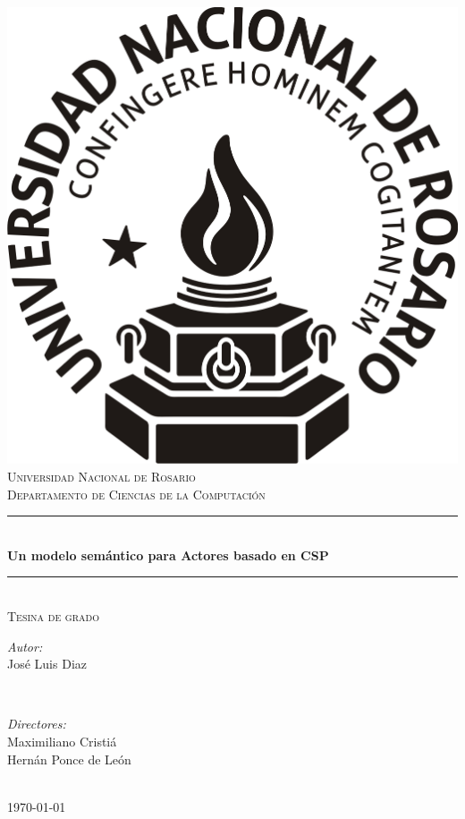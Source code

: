 \begin{titlepage}
\centering
\vspace*{0.5 cm}
        \includegraphics[width=3.0 cm]{img/logo.png}\\[1.0 cm]
        \textsc{\LARGE Universidad Nacional de Rosario}\\[0.5 cm]
	\textsc{\large Departamento de Ciencias de la Computaci\'{o}n}\\[2.5 cm]

	\rule{\linewidth}{0.3 mm} \\[0.4 cm]
	{ \huge \bfseries Un modelo semántico para Actores basado en CSP }\\
	\rule{\linewidth}{0.3 mm} \\[0.5 cm]
	\textsc{\Large Tesina de grado}\\[2.5 cm]
	
	\begin{minipage}{0.4\textwidth}
	\begin{flushleft} \large
	  \emph{Autor:}\\
	  José Luis Diaz  \\
	\end{flushleft}
	\end{minipage}~
	\begin{minipage}{0.4\textwidth}
        \begin{flushright} \large
	  \emph{Directores:} \\
	  Maximiliano Cristiá \\
	  Hernán Ponce de León \\
	\end{flushright}        
	\end{minipage}\\[1.5 cm]
        \today

\end{titlepage}